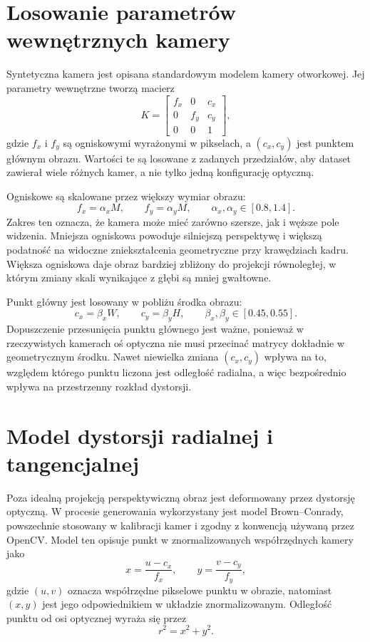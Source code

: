 \documentclass[12pt,a4paper]{report}
\begin{document}
\section{Losowanie parametrów wewnętrznych kamery}
Syntetyczna kamera jest opisana standardowym modelem kamery otworkowej. Jej parametry
wewnętrzne tworzą macierz
\begin{equation}
    K =
    \begin{bmatrix}
        f_x & 0   & c_x \\
        0   & f_y & c_y \\
        0   & 0   & 1
    \end{bmatrix},
\end{equation}
gdzie $f_x$ i $f_y$ są ogniskowymi wyrażonymi w pikselach, a $(c_x,c_y)$ jest punktem
głównym obrazu. Wartości te są losowane z zadanych przedziałów, aby dataset zawierał wiele
różnych kamer, a nie tylko jedną konfigurację optyczną.

Ogniskowe są skalowane przez większy wymiar obrazu:
\begin{equation}
    f_x = \alpha_x M,
    \qquad
    f_y = \alpha_y M,
    \qquad
    \alpha_x,\alpha_y \in [0.8,1.4].
\end{equation}
Zakres ten oznacza, że kamera może mieć zarówno szersze, jak i węższe pole widzenia.
Mniejsza ogniskowa powoduje silniejszą perspektywę i większą podatność na widoczne
zniekształcenia geometryczne przy krawędziach kadru. Większa ogniskowa daje obraz bardziej
zbliżony do projekcji równoległej, w którym zmiany skali wynikające z głębi są mniej
gwałtowne.

Punkt główny jest losowany w pobliżu środka obrazu:
\begin{equation}
    c_x = \beta_x W,
    \qquad
    c_y = \beta_y H,
    \qquad
    \beta_x,\beta_y \in [0.45,0.55].
\end{equation}
Dopuszczenie przesunięcia punktu głównego jest ważne, ponieważ w rzeczywistych kamerach oś
optyczna nie musi przecinać matrycy dokładnie w geometrycznym środku. Nawet niewielka zmiana
$(c_x,c_y)$ wpływa na to, względem którego punktu liczona jest odległość radialna, a więc
bezpośrednio wpływa na przestrzenny rozkład dystorsji.

\section{Model dystorsji radialnej i tangencjalnej}
Poza idealną projekcją perspektywiczną obraz jest deformowany przez dystorsję optyczną.
W procesie generowania wykorzystany jest model Brown--Conrady, powszechnie stosowany
w kalibracji kamer i zgodny z konwencją używaną przez OpenCV. Model ten opisuje punkt
w znormalizowanych współrzędnych kamery jako
\begin{equation}
    x = \frac{u-c_x}{f_x},
    \qquad
    y = \frac{v-c_y}{f_y},
\end{equation}
gdzie $(u,v)$ oznacza współrzędne pikselowe punktu w obrazie, natomiast $(x,y)$ jest jego
odpowiednikiem w układzie znormalizowanym. Odległość punktu od osi optycznej wyraża się przez
\begin{equation}
    r^2 = x^2 + y^2.
\end{equation}
\end{document}
